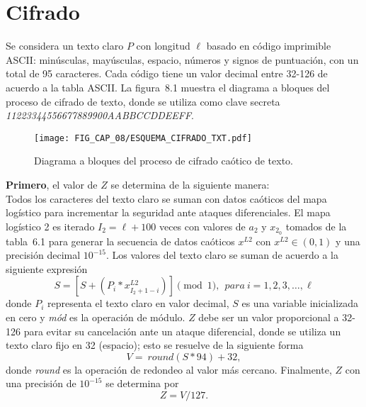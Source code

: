 \section{Cifrado}
Se considera un texto claro $P$ con longitud $\ell$ basado en código imprimible ASCII: minúsculas, mayúsculas, espacio, números y signos de puntuación, con un total de 95 caracteres. Cada código tiene un valor decimal entre 32-126 de acuerdo a la tabla ASCII. La figura~8.1 muestra el diagrama a bloques del proceso de cifrado de texto, donde se utiliza como clave secreta \textit{11223344556677889900AABBCCDDEEFF}. \\

\begin{figure}[!htbp] %
	\center
	\texttt{[image: FIG\_CAP\_08/ESQUEMA\_CIFRADO\_TXT.pdf]}     
	\caption{Diagrama a bloques del proceso de cifrado caótico de texto.}
\end{figure}

\textbf{Primero}, el valor de $Z$ se determina de la siguiente manera:  \\

Todos los caracteres del texto claro se suman con datos caóticos del mapa logístico para incrementar la seguridad ante ataques diferenciales. El mapa logístico 2 es iterado $I_{2}=\ell +100$ veces con valores de $a_{2}$ y $x_{2_{0}}$ tomados de la tabla~6.1 para generar la secuencia de datos caóticos $x^{L2}$ con $x^{L2}\in (0,1)$ y una precisión decimal $10^{-15}$.  Los valores del texto claro se suman de acuerdo a la siguiente expresión
\begin{equation}
S=\left[ S+ \left( P_{i}\ast x_{I_{2}+1-i}^{L2}\right) \right] \pmod 1, ~~ para ~i=1,2,3,\ldots ,\ell
\end{equation}
donde $P_{i}$ representa el texto claro en valor decimal, $S$ es una variable inicializada en cero y \textit{mód} es la operación de módulo. $Z$ debe ser un valor proporcional a 32-126 para evitar su cancelación ante un ataque diferencial, donde se utiliza un texto claro fijo en 32 (espacio); esto se resuelve de la siguiente forma
\begin{equation}
V=~round(S\ast 94)+32,
\end{equation}
donde \textit{round} es la operación de redondeo al valor más cercano. Finalmente, $Z$ con una precisión de $10^{-15}$ se determina por
\begin{equation}
Z=V/127.
\end{equation}


